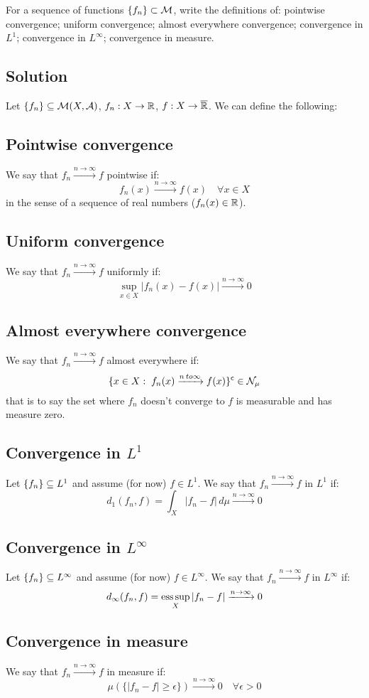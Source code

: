 
\question
For a sequence of functions $\seq{f} \subset \Mes$, write the definitions of: pointwise convergence; uniform convergence; almost everywhere convergence; convergence in $L^1$; convergence in $L^\infty$; convergence in measure.

\subsection*{Solution}

Let $\seq{f}\subseteq \Mes(X,\A)$, $f_n:X\to\R$, $f:X\to\Rcomp$. We can define the following:

\subsection{Pointwise convergence}
We say that $f_n \xrightarrow{n\to\infty} f$ pointwise if:
\[
    f_n(x) \xrightarrow{n\to\infty} f(x) \quad \forall x \in X
\]
in the sense of a sequence of real numbers ($f_n(x)\in\R$).

\subsection{Uniform convergence}
We say that $f_n \xrightarrow{n\to\infty} f$ uniformly if:
\[
    \sup_{x\in X} |f_n(x)-f(x)| \xrightarrow{n\to\infty} 0
\]

\subsection{Almost everywhere convergence}
We say that $f_n \xrightarrow{n\to\infty} f$ almost everywhere if:
\[
    \{ x\in X : \; f_n(x) \xrightarrow{n\\to\infty} f(x) \}^\complement \in \mathcal{N}_\mu
\]
that is to say the set where $f_n$ doesn't converge to $f$ is measurable and has measure zero.

\subsection{Convergence in \texorpdfstring{$L^1$}{L1}}
Let $\seq{f}\subseteq L^1$ and assume (for now) $f\in L^1$. We say that $f_n \xrightarrow{n\to\infty} f$ in $L^1$ if:
\[
    d_1(f_n,f) = \int_X |f_n-f| \, d\mu \xrightarrow{n\to\infty} 0    
\]

\subsection{Convergence in \texorpdfstring{$L^\infty$}{Linf}}
Let $\seq{f}\subseteq L^\infty$ and assume (for now) $f\in L^\infty$. We say that $f_n \xrightarrow{n\to\infty} f$ in $L^\infty$ if:
\[
    d_\infty(f_n,f) = \esssup_X |f_n-f| \xrightarrow{n\to\infty} 0
\]

\subsection{Convergence in measure}\label{conv:meas}
We say that $f_n \xrightarrow{n\to\infty} f$ in measure if:
\[
    \mu (\{ |f_n-f| \geq \epsilon \}) \xrightarrow{n\to\infty} 0 \quad \forall \epsilon > 0   
\]
